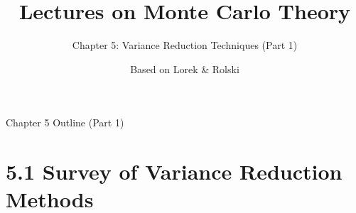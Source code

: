 \documentclass[aspectratio=169,10pt]{beamer}
\title[MC Theory -- Ch.5]{Lectures on Monte Carlo Theory}
\subtitle{Chapter 5: Variance Reduction Techniques (Part 1)}
\author{Based on Lorek \& Rolski}
\date{}
\begin{document}
\begin{frame}
  \titlepage
\end{frame}

\begin{frame}{Chapter 5 Outline (Part 1)}
  \tableofcontents[hideallsubsections]
\end{frame}

\section{5.1 Survey of Variance Reduction Methods}
\end{document}
